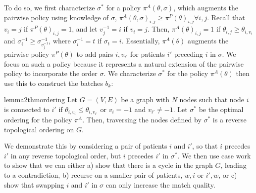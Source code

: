 To do so, we first characterize $\sigma^{*}$ for a policy $\pi^{A}(\theta,\sigma)$, which augments the pairwise policy using knowledge of $\sigma$, $\pi^{A}(\theta,\sigma)_{i,j} \geq \pi^{P}(\theta)_{i,j} \forall i,j$. 
Recall that $v_{i} = j$ if $\pi^{P}(\theta)_{i,j} = 1$, and let $v^{-1}_{j} = i$ if $v_{i}=j$. 
Then, $\pi^{A}(\theta)_{i,j} = 1$ if $\theta_{i,j} \geq \theta_{i,v_{i}}$ and $\sigma^{-1}_{i} \geq \sigma^{-1}_{v^{-1}_{j}}$, where $\sigma^{-1}_{i} = t$ if $\sigma_{t} = i$. 
Essentially, $\pi^{A}(\theta)$ augments the pairwise policy $\pi^{P}(\theta)$ to add pairs $i,v_{i'}$ for patients $i'$ preceding $i$ in $\sigma$. 
We focus on such a policy because it represents a natural extension of the pairwise policy to incorporate the order $\sigma$. 
We characterize $\sigma^{*}$ for the policy $\pi^{A}(\theta)$ then use this to construct the batches $b_{k}$: 
\begin{restatable}{lemma2}{thmordering} 
    Let $G=(V,E)$ be a graph with $N$ nodes such that node $i$ is connected to $i'$ if $\theta_{i,v_{i}} \leq \theta_{i,v_{i'}}$ or $v_{i} = -1$ and $v_{i'} \neq -1$. 
    Let $\sigma^{*}$ be the optimal ordering for the policy $\pi^{A}$.
    Then, traversing the nodes defined by $\sigma^{*}$ is a reverse topological ordering on $G$. 
\end{restatable}
We demonstrate this by considering a pair of patients $i$ and $i'$, so that $i$ precedes $i'$ in any reverse topological order, but $i$ precedes $i'$ in $\sigma^{*}$. 
We then use case work to show that we can either a) show that there is a cycle in the graph $G$, leading to a contradiction, b) recurse on a smaller pair of patients, $w,i$ or $i',w$, or c) show that swapping $i$ and $i'$ in $\sigma$ can only increase the match quality. 

